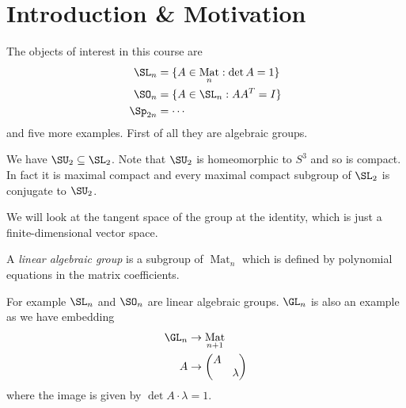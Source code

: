 \documentclass[a4paper]{article}
\DeclareMathOperator{\Mat}{Mat}
\begin{document}


\tableofcontents

\section{Introduction \& Motivation}

The objects of interest in this course are
\begin{align*}
  \SL_n &= \{A \in \Mat_n: \det A = 1\} \\
  \SO_n &= \{A \in \SL_n: AA^T = I\} \\
  \Sp_{2n} &= \cdots
\end{align*}
and five more examples. First of all they are algebraic groups.

We have \(\SU_2 \subseteq \SL_2\). Note that \(\SU_2\) is homeomorphic to \(S^3\) and so is compact. In fact it is maximal compact and every maximal compact subgroup of \(\SL_2\) is conjugate to \(\SU_2\).

We will look at the tangent space of the group at the identity, which is just a finite-dimensional vector space.

\begin{definition}
  A \emph{linear algebraic group} is a subgroup of \(\Mat_n\) which is defined by polynomial equations in the matrix coefficients.
\end{definition}

For example \(\SL_n\) and \(\SO_n\) are linear algebraic groups. \(\GL_n\) is also an example as we have embedding
\begin{align*}
  \GL_n &\to \Mat_{n + 1} \\
  A &\to
      \begin{pmatrix}
        A & \\
        & \lambda
      \end{pmatrix}
\end{align*}
where the image is given by \(\det A \cdot \lambda = 1\).
\end{document}
